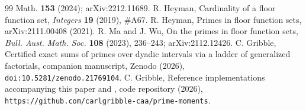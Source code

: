 \documentclass[11pt]{article}
\theoremstyle{remark}
\begin{document}
\begin{thebibliography}{99}
{Math.} \textbf{153} (2024); arXiv:2212.11689.
 R. Heyman, Cardinality of a floor function set, \emph{Integers} \textbf{19} (2019),
\#A67.
 R. Heyman, Primes in floor function sets, arXiv:2111.00408 (2021).
 R. Ma and J. Wu, On the primes in floor function sets, \emph{Bull. Aust. Math. Soc.}
\textbf{108} (2023), 236--243; arXiv:2112.12426.
 C. Gribble, Certified exact sums of primes over dyadic intervals via a ladder
of generalized factorials, companion manuscript, Zenodo (2026), \texttt{doi:10.5281/zenodo.21769104}.
 C. Gribble, Reference implementations accompanying this paper and \cite{Companion},
code repository (2026), \texttt{https://github.com/carlgribble-caa/prime-moments}.
\end{thebibliography}
\end{document}
